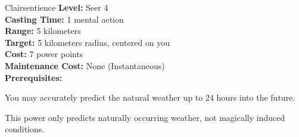 {Clairsentience}
{
	\textbf{Level:}
	Seer 4\\
	\textbf{Casting Time:}
	1 mental action\\
	\textbf{Range:}
	5 kilometers\\
	\textbf{Target:}
	5 kilometers radius, centered on you\\
	\textbf{Cost:}
	7 power points\\
	\textbf{Maintenance Cost:}
	None (Instantaneous)\\
	\textbf{Prerequisites:}
	\\
}
{
	You may accurately predict the natural weather up to 24 hours into the future.

	This power only predicts naturally occurring weather, not magically induced conditions.
}